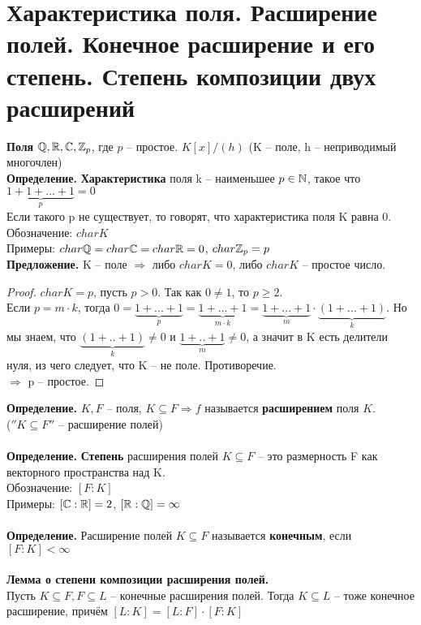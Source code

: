 \section{Характеристика поля. Расширение полей. Конечное расширение и его степень. Степень композиции двух расширений}

\textbf{Поля} $\mathbb{Q}, \mathbb{R}, \mathbb{C}, \mathbb{Z}_p$, где $p$ -- простое. $K[x]/(h)$ (K -- поле, h -- неприводимый многочлен)\\
\textbf{Определение.} \textbf{Характеристика} поля k -- наименьшее $p\in \mathbb{N}$, такое что $\underbrace{1+1+...+1}_{p}=0$\\
Если такого p не существует, то говорят, что характеристика поля K равна 0.\\
Обозначение: $char K$\\
Примеры: $char\mathbb{Q}=char\mathbb{C}=char\mathbb{R}=0$, $char\mathbb{Z}_p=p$\\
\textbf{Предложение.} K -- поле $\Rightarrow$ либо $char K=0$, либо $char K$ -- простое число.
\begin{proof}
    $char K = p$, пусть $p> 0$. Так как $0\neq 1$, то $p\geqslant 2$.\\
    Если $p=m\cdot k$, тогда $0=\underbrace{1+...+1}_{p}=\underbrace{1+...+1}_{m\cdot k}=\underbrace{1+...+1}_{m}\cdot\underbrace{(1+...+1)}_{k}$. Но мы знаем, что $\underbrace{(1+..+1)}_{k}\neq 0$ и $\underbrace{1+..+1}_{m}\neq 0$, а значит в K есть делители нуля, из чего следует, что K -- не поле. Противоречие.\\
    $\Rightarrow$ p -- простое.
\end{proof}
\noindent \textbf{Определение.} $K, F$ -- поля, $K\subseteq F\Rightarrow f$ называется \textbf{расширением} поля $K$.\\ ($''K\subseteq F''$ -- расширение полей)\\\\
\textbf{Определение.} \textbf{Степень} расширения полей $K\subseteq F$ -- это размерность F как векторного пространства над K.\\
Обозначение: $[F:K]$\\
Примеры: $[\mathbb{C}:\mathbb{R}]=2$, $[\mathbb{R}:\mathbb{Q}]=\infty$\\\\
\textbf{Определение.} Расширение полей $K\subseteq F$ называется \textbf{конечным}, если $[F:K]<\infty$\\\\
\textbf{Лемма о степени композиции расширения полей.}\\
Пусть $K\subseteq F, F\subseteq L$ -- конечные расширения полей. Тогда $K\subseteq L$ -- тоже конечное расширение, причём $[L:K]=[L:F]\cdot[F:K]$
